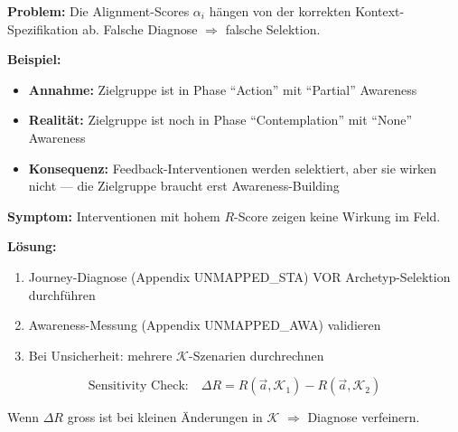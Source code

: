 \begin{tcolorbox}[colback=red!5!white, colframe=red!75!black,
    title=\textbf{Failure Mode 1: Kontext-Fehldiagnose}]

\textbf{Problem:} Die Alignment-Scores $\alpha_i$ hängen von der korrekten Kontext-Spezifikation ab. Falsche Diagnose $\Rightarrow$ falsche Selektion.

\medskip
\textbf{Beispiel:}
\begin{itemize}[nosep]
    \item \textbf{Annahme:} Zielgruppe ist in Phase ``Action'' mit ``Partial'' Awareness
    \item \textbf{Realität:} Zielgruppe ist noch in Phase ``Contemplation'' mit ``None'' Awareness
    \item \textbf{Konsequenz:} Feedback-Interventionen werden selektiert, aber sie wirken nicht --- die Zielgruppe braucht erst Awareness-Building
\end{itemize}

\medskip
\textbf{Symptom:} Interventionen mit hohem $R$-Score zeigen keine Wirkung im Feld.

\textbf{Lösung:}
\begin{enumerate}[nosep]
    \item Journey-Diagnose (Appendix UNMAPPED_STA) VOR Archetyp-Selektion durchführen
    \item Awareness-Messung (Appendix UNMAPPED_AWA) validieren
    \item Bei Unsicherheit: mehrere $\mathcal{K}$-Szenarien durchrechnen
\end{enumerate}

\begin{equation*}
\text{Sensitivity Check:} \quad \Delta R = R(\vec{a}, \mathcal{K}_1) - R(\vec{a}, \mathcal{K}_2)
\end{equation*}

Wenn $\Delta R$ gross ist bei kleinen Änderungen in $\mathcal{K}$ $\Rightarrow$ Diagnose verfeinern.

\end{tcolorbox}

